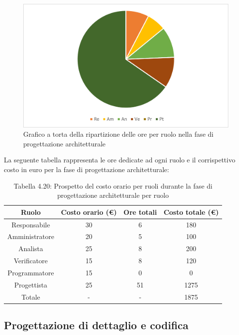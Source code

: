 \begin{figure}[H]
    \centering
    \includegraphics[scale=0.6]{img/grafi preventivo/torta/architetturale/complessivo.png}
    \caption{Grafico a torta della ripartizione delle ore per ruolo nella fase di progettazione architetturale}
\end{figure}
La seguente tabella rappresenta le ore dedicate ad ogni ruolo e il corrispettivo costo in euro per la fase di progettazione architetturale:
\begin{table}[h]
	\setlength\extrarowheight{5pt}
	\centering
	\begin{tabularx}{\textwidth}{|ccc|c|}
		\hline
		\rowcolor{white}
		\textbf{Ruolo} & \textbf{Costo orario (€)} & \textbf{Ore totali} & \textbf{Costo totale (€)} \\
		\hline
		Responsabile &30&6&180 \\
		Amministratore &20&5&100 \\
		Analista &25&8&200 \\
		Verificatore &15&8&120 \\
		Programmatore &15&0&0 \\
		Progettista &25&51&1275 \\
		\hline
		Totale &-&-&1875 \\
		\hline
	\end{tabularx}
    \vspace{10pt}
	\caption{Tabella 4.20: Prospetto del costo orario per ruoli durante la fase di progettazione architetturale per ruolo}
\end{table}
\newpage
\subsection{Progettazione di dettaglio e codifica}
